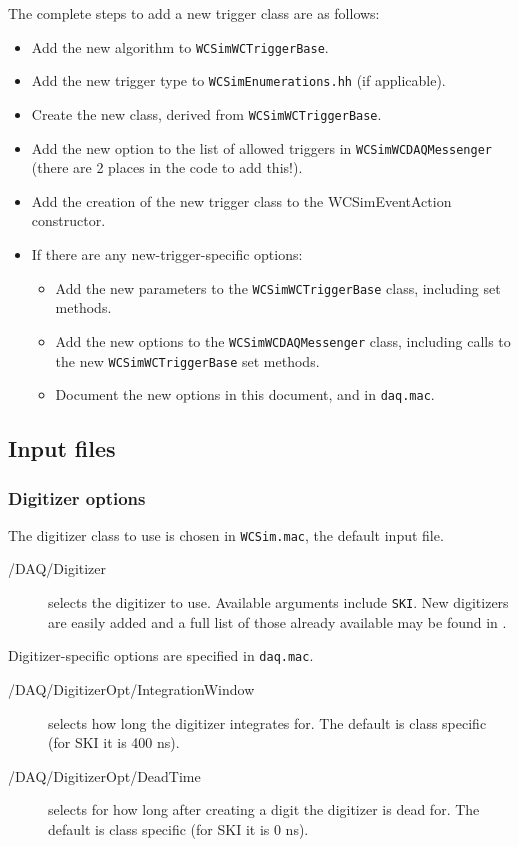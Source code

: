 The complete steps to add a new trigger class are as follows:
\begin{itemize}
\item Add the new algorithm to \texttt{WCSimWCTriggerBase}.
\item Add the new trigger type to \texttt{WCSimEnumerations.hh} (if applicable).
\item Create the new class, derived from \texttt{WCSimWCTriggerBase}.
\item Add the new option to the list of allowed triggers in \texttt{WCSimWCDAQMessenger} (there are 2 places in the code to add this!). 
\item Add the creation of the new trigger class to the WCSimEventAction constructor.
\item If there are any new-trigger-specific options:
  \begin{itemize}
  \item Add the new parameters to the \texttt{WCSimWCTriggerBase} class, including set methods.
  \item Add the new options to the \texttt{WCSimWCDAQMessenger} class, including calls to the new \texttt{WCSimWCTriggerBase} set methods.
  \item Document the new options in this document, and in \texttt{daq.mac}.
  \end{itemize}
\end{itemize}


\subsection{Input files}
\label{sec:daq:options}

\subsubsection{Digitizer options}
The digitizer class to use is chosen in \texttt{WCSim.mac}, the default input file.
\begin{description}
\item[/DAQ/Digitizer] selects the digitizer to use. Available arguments include \texttt{SKI}. New digitizers are easily added and a full list of those already available may be found in .
\end{description}
Digitizer-specific options are specified in \texttt{daq.mac}.
\begin{description}
\item[/DAQ/DigitizerOpt/IntegrationWindow] selects how long the digitizer integrates for. The default is class specific (for SKI it is 400 ns).
\item[/DAQ/DigitizerOpt/DeadTime] selects for how long after creating a digit the digitizer is dead for. The default is class specific (for SKI it is 0 ns).
\end{description}

